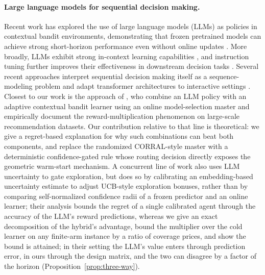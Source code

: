 \documentclass[anon]{alt2027} %
\begin{document}
\paragraph{Large language models for sequential decision making.}
Recent work has explored the use of large language models (LLMs) as policies
in contextual bandit environments, demonstrating that frozen pretrained
models can achieve strong short-horizon performance even without online
updates \citep{chen2024llmdecision}. More broadly, LLMs exhibit strong
in-context learning capabilities \citep{brown2020language,xie2021explanation,
garg2022can,akyurek2022learning}, and instruction tuning further improves
their effectiveness in downstream decision tasks
\citep{ouyang2022training,chung2024scaling}. Several recent approaches
interpret sequential decision making itself as a sequence-modeling problem
and adapt transformer architectures to interactive settings
\citep{chen2021decision,zheng2022online,reid2022can,sun2023smart,
raparthy2023generalization,lee2023supervised}.
Closest to our work is the approach of \citet{chen2024llmdecision}, who
combine an LLM policy with an adaptive contextual bandit learner using an
online model-selection master and empirically document the
reward-multiplication phenomenon on large-scale recommendation datasets.
Our contribution relative to that line is theoretical: we give a
regret-based explanation for why such combinations can beat both components,
and replace the randomized CORRAL-style master with a deterministic
confidence-gated rule whose routing decision directly exposes the geometric
warm-start mechanism. A concurrent line of work \citep{huangcontextual} also
uses LLM uncertainty to gate exploration, but does so by calibrating an
embedding-based uncertainty estimate to adjust UCB-style exploration
bonuses, rather than by comparing self-normalized confidence radii of a
frozen predictor and an online learner; their analysis bounds the regret
of a single calibrated agent through the accuracy of the LLM's reward
predictions, whereas we give an exact decomposition of the hybrid's
advantage, bound the multiplier over the cold learner on any finite-arm
instance by a ratio of coverage prices, and show the bound is attained; in
their setting the LLM's value enters through prediction error, in ours
through the design matrix, and the two can disagree by a factor of the
horizon (Proposition~\ref{prop:three-way}).
\end{document}
